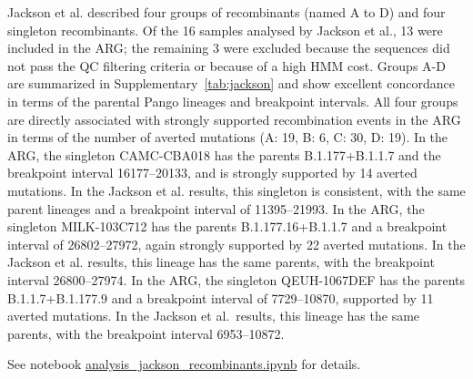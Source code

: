 \documentclass[12pt]{article}
\newcommand{\siref}[1]{Supplementary~\ref{#1}}
\begin{document}
Jackson et al. described
four groups of recombinants (named A to D) and four singleton recombinants.
Of the 16 samples analysed by Jackson et al., 13 were included in the ARG;
the remaining 3 were excluded
because the sequences did not pass the QC filtering criteria or
because of a high HMM cost.
Groups A-D are summarized in \siref{tab:jackson} and
show excellent concordance
in terms of the parental Pango lineages and breakpoint intervals.
All four groups are directly associated with
strongly supported recombination events in the ARG
in terms of the number of averted mutations (A: 19, B: 6, C: 30, D: 19).
In the ARG, the singleton CAMC-CBA018 has
the parents B.1.177+B.1.1.7 and
the breakpoint interval 16177--20133, and
is strongly supported by 14 averted mutations.
In the Jackson et al. results, this singleton is
consistent, with the same parent lineages and
a breakpoint interval of 11395--21993.
In the ARG, the singleton MILK-103C712 has
the parents B.1.177.16+B.1.1.7 and
a breakpoint interval of 26802--27972,
again strongly supported by 22 averted mutations.
In the Jackson et al. results,
this lineage has the same parents,
with the breakpoint interval 26800--27974.
In the ARG, the singleton QEUH-1067DEF has
the parents B.1.1.7+B.1.177.9 and
a breakpoint interval of 7729--10870,
supported by 11 averted mutations.
In the Jackson et al.\ results,
this lineage has the same parents,
with the breakpoint interval 6953--10872.

See notebook
\href{https://github.com/jeromekelleher/sc2ts-paper/blob/main/notebooks/analysis\_jackson\_recombinants.ipynb}
{analysis\_jackson\_recombinants.ipynb}
for details.
\end{document}
